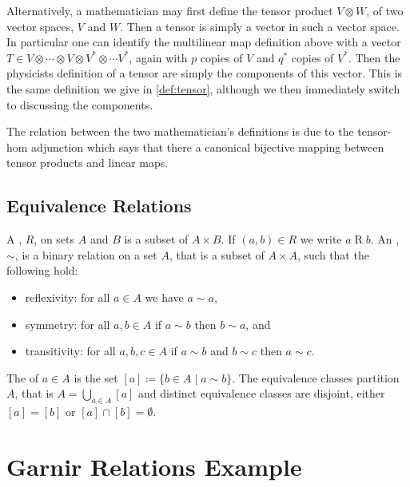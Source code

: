 \documentclass[fleqn]{NotesClass}
\begin{document}
\begin{appendices}
        Alternatively, a mathematician may first define the tensor product \(V \otimes W\), of two vector spaces, \(V\) and \(W\).
        Then a tensor is simply a vector in such a vector space.
        In particular one can identify the multilinear map definition above with a vector \(T \in V \otimes \dotsb \otimes V \otimes V^* \otimes \dotsm V^*\), again with \(p\) copies of \(V\) and \(q^*\) copies of \(V^*\).
        Then the physicists definition of a tensor are simply the components of this vector.
        This is the same definition we give in \cref{def:tensor}, although we then immediately switch to discussing the components.
        
        The relation between the two mathematician's definitions is due to the tensor-hom adjunction which says that there a canonical bijective mapping between tensor products and linear maps.
        
        \section{Equivalence Relations}\label{sec:equivalence relations}
        A , \(R\), on sets \(A\) and \(B\) is a subset of \(A \times B\).
        If \((a, b) \in R\) we write \(a \mathbin{R} b\).
        An , \(\sim\), is a binary relation on a set \(A\), that is a subset of \(A \times A\), such that the following hold:
        \begin{itemize}
            \item reflexivity: for all \(a \in A\) we have \(a \sim a\),
            \item symmetry: for all \(a, b \in A\) if \(a \sim b\) then \(b \sim a\), and
            \item transitivity: for all \(a, b, c \in A\) if \(a \sim b\) and \(b \sim c\) then \(a \sim c\).
        \end{itemize}
        
        The  of \(a \in A\) is the set \([a] \coloneqq \{b \in A \mid a \sim b\}\).
        The equivalence classes partition \(A\), that is \(A = \bigcup_{a \in A} [a]\) and distinct equivalence classes are disjoint, either \([a] = [b]\) or \([a] \cap [b] = \emptyset\).
        
        \chapter{Garnir Relations Example}\label{app:garnir example}

\end{appendices}
\end{document}
